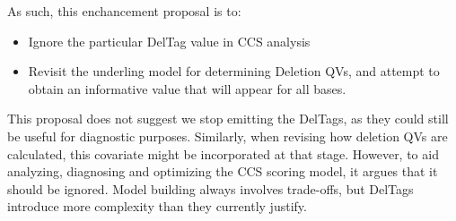 \documentclass[fleqn,10pt]{SelfArx} %
\begin{document}
As such, this enchancement proposal is to:
\begin{itemize}[noitemsep] %
\item Ignore the particular DelTag value in CCS analysis 
\item Revisit the underling model for determining Deletion QVs, and attempt to obtain an informative value that will appear for all bases.  
\end{itemize}
 
This proposal does not suggest we stop emitting the DelTags, as they could still be useful for diagnostic purposes.  Similarly, when revising how deletion QVs are calculated, this covariate might be incorporated at that stage.  However, to aid analyzing, diagnosing and optimizing the CCS scoring model, it argues that it should be ignored. Model building always involves trade-offs, but DelTags introduce more complexity than they currently justify.



\end{document}
